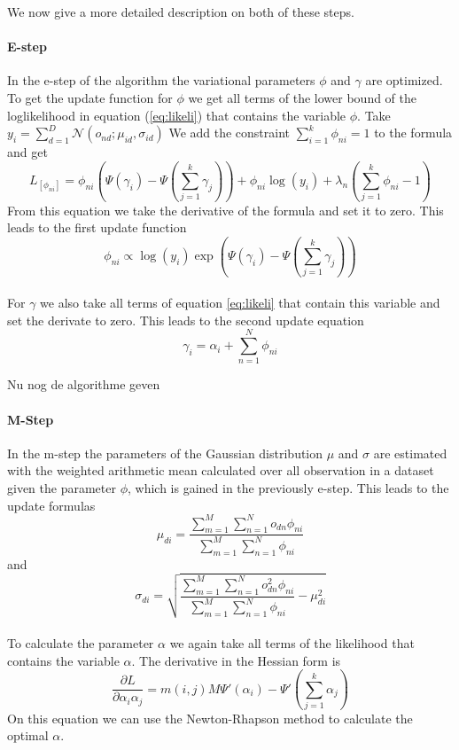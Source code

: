 \documentclass[11pt,a4paper]{article}
\begin{document}
  We now give a more detailed description on both of these steps.
  
  \paragraph{E-step}
In the e-step of the algorithm the variational parameters $\phi$ and $\gamma$ are optimized. To get the update function for $\phi$ we get all terms of the lower bound of the loglikelihood in equation (\ref{eq:likeli}) that contains the variable $\phi$. 
Take $y_i=\sum_{d=1}^D \mathcal{N}(o_{nd};\mu_{id},\sigma_{id})$
We add the constraint $\sum_{i=1}^k \phi_{ni}=1 $ to the formula and get
\begin{equation}
 L_{[\phi_{ni}]} = \phi_{ni}(\Psi(\gamma_i)-\Psi(\sum_{j=1}^k \gamma_j)) + \phi_{ni} \log(y_i) + \lambda_n(\sum_{j=1}^k \phi_{ni} -1)
\end{equation}
From this equation we take the derivative of the formula and set it to zero. This leads to the first update function
\begin{equation}
 \phi_{ni} \propto \log(y_i) \exp(\Psi(\gamma_i) - \Psi(\sum_{j=1}^k \gamma_j))
\end{equation}
\\
For $\gamma$  we also take all terms of equation \ref{eq:likeli} that contain this variable and set the derivate to zero. This leads to the second update equation
\begin{equation}
 \gamma_i = \alpha_i + \sum_{n=1}^N \phi_{ni}
\end{equation}

  Nu nog de algorithme geven

  \paragraph{M-Step}
  
In the m-step the parameters of the Gaussian distribution $\mu$ and $\sigma$ are estimated with the weighted arithmetic mean calculated over all observation in a dataset given the parameter $\phi$, which is gained in the previously e-step. This leads to the update formulas
\begin{equation}
 \mu_{di} = \frac{\sum_{m=1}^M \sum_{n=1}^N o_{dn} \phi_{ni} }{\sum_{m=1}^M \sum_{n=1}^N  \phi_{ni}}
\end{equation}
and
\begin{equation}
 \sigma_{di} = \sqrt{\frac{\sum_{m=1}^M \sum_{n=1}^N o_{dn}^2 \phi_{ni} }{\sum_{m=1}^M \sum_{n=1}^N  \phi_{ni}} - \mu_{di}^2}
\end{equation}
\\
To calculate the parameter $\alpha$ we again take all terms of the likelihood that contains the variable $\alpha$. The derivative in the Hessian form is
\begin{equation}
 \frac{\partial L}{\partial \alpha_i\alpha_j} =  m(i,j) M \Psi'(\alpha_i) - \Psi'(\sum_{j=1}^k \alpha_j)
\end{equation}
On this equation we can use the Newton-Rhapson method to calculate the optimal $\alpha$.
\end{document}
